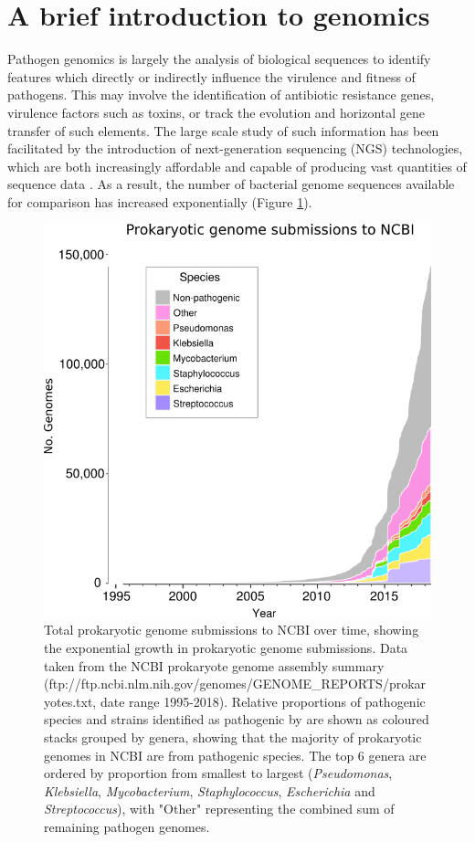 \section{A brief introduction to genomics}
Pathogen genomics is largely the analysis of biological sequences to identify features which directly or indirectly influence the virulence and fitness of pathogens. This may involve the identification of antibiotic resistance genes, virulence factors such as toxins, or track the evolution and horizontal gene transfer of such elements. The large scale study of such information has been facilitated by the introduction of next-generation sequencing (NGS) technologies, which are both increasingly affordable and capable of producing vast quantities of sequence data \citep{Goodwin2016-on}. As a result, the number of bacterial genome sequences available for comparison has increased exponentially (Figure \ref{fig:path_graph}).
\begin{figure}[H]
  \includegraphics[scale=0.65]{intro/path_graph.png}
  \centering
  \caption[Total prokaryotic genome submissions to NCBI over time]{Total prokaryotic genome submissions to NCBI over time, showing the exponential growth in prokaryotic genome submissions. Data taken from the NCBI prokaryote genome assembly summary  (ftp://ftp.ncbi.nlm.nih.gov/genomes/GENOME_REPORTS/prokaryotes.txt, date range 1995-2018). Relative proportions of pathogenic species and strains identified as pathogenic by \cite{Ecker2005} are shown as coloured stacks grouped by genera, showing that the majority of prokaryotic genomes in NCBI are from pathogenic species. The top 6 genera are ordered by proportion from smallest to largest (\textit{Pseudomonas}, \textit{Klebsiella}, \textit{Mycobacterium}, \textit{Staphylococcus}, \textit{Escherichia} and \textit{Streptococcus}), with "Other" representing the combined sum of remaining pathogen genomes.}
  \label{fig:path_graph}
\end{figure}
